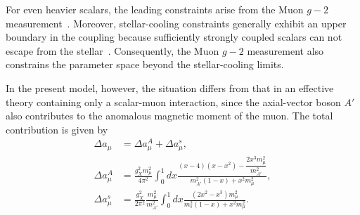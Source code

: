 \documentclass[onecolumn, aps, nofootinbib, prd, preprint, floats, floatfix, amsmath, amssymb, superscriptaddress, preprintnumbers]{revtex4-1}
\begin{document}

For even heavier scalars, the leading constraints arise from the Muon $g-2$ measurement~\cite{Chen:2015vqy}.
Moreover, stellar-cooling constraints generally exhibit an upper boundary in the coupling because sufficiently strongly coupled scalars can not escape from the stellar~\cite{Caputo:2021rux, Balazs:2022tjl}.
Consequently, the Muon $g-2$ measurement also constrains the parameter space beyond the stellar-cooling limits.

In the present model, however, the situation differs from that in an effective theory containing only a scalar-muon interaction, since the axial-vector boson $A'$ also contributes to the anomalous magnetic moment of the muon.
The total contribution is given by~\cite{Leveille:1977rc, Tucker-Smith:2010wdq}
\begin{equation}
\begin{aligned}
\Delta a_\mu &= \Delta a^A_\mu+\Delta a^s_\mu,\\
\Delta a^A_\mu
&=
\frac{g_X^2 m^2_\mu}{4\pi^2}
\int_0^1dx
\frac{(x-4)(x-x^2)-\dfrac{2x^3m_\mu^2}{m_{A'}^2}}
{m_{A'}^2(1-x)+x^2m_\mu^2},\\
\Delta a^s_\mu
&=
\frac{g_X^2}{2\pi^2}
\frac{m_\mu^2}{m_{A'}^2}
\int_0^1dx
\frac{(2x^2-x^3)m_\mu^2}
{m_s^2(1-x)+x^2m_\mu^2}.
\end{aligned}
\end{equation}
\end{document}
